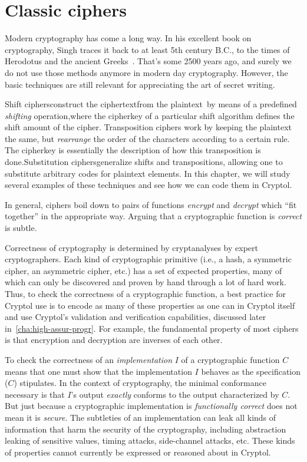 \chapter{Classic ciphers}
\label{chapter:classic}

Modern cryptography has come a long way. In his excellent book on
cryptography, Singh traces it back to at least 5th century B.C., to
the times of Herodotus and the ancient Greeks~\cite{Singh:1999:CBE}.
That's some 2500 years ago, and surely we do not use those methods
anymore in modern day cryptography. However, the basic techniques are
still relevant for appreciating the art of secret writing.

Shift ciphers\indShiftcipher construct the \glosCiphertext
ciphertext\indCiphertext from the \glosPlaintext
plaintext\indPlaintext\ by means of a predefined {\em shifting}
operation,\glosCipherkey where the cipherkey of a particular shift
algorithm defines the shift amount of the cipher.\indCipherkey
Transposition ciphers work by keeping the plaintext the same, but {\em
  rearrange} the order of the characters according to a certain rule.
The cipherkey is essentially the description of how this transposition
is done.\indTranspositioncipher Substitution
ciphers\indSubstitutioncipher generalize shifts and transpositions,
allowing one to substitute arbitrary codes for plaintext elements.  In
this chapter, we will study several examples of these techniques and
see how we can code them in Cryptol.

In general, ciphers boil down to pairs of functions \emph{encrypt} and
\emph{decrypt} which ``fit together'' in the appropriate way.  Arguing
that a cryptographic function is \emph{correct} is subtle.

Correctness of cryptography is determined by cryptanalyses by expert
cryptographers.  Each kind of cryptographic primitive (i.e., a hash, a
symmetric cipher, an asymmetric cipher, etc.) has a set of expected
properties, many of which can only be discovered and proven by hand
through a lot of hard work.  Thus, to check the correctness of a
cryptographic function, a best practice for Cryptol use is to encode
as many of these properties as one can in Cryptol itself and use
Cryptol's validation and verification capabilities, discussed
later in~\autoref{cha:high-assur-progr}.  For example, the fundamental
property of most ciphers is that encryption and decryption are
inverses of each other.

To check the correctness of an \emph{implementation} $I$ of a
cryptographic function $C$ means that one must show that the
implementation $I$ behaves as the specification ($C$) stipulates.  In
the context of cryptography, the minimal conformance necessary is
that $I$'s output \emph{exactly} conforms to the output characterized
by $C$.  But just because a cryptographic implementation is
\emph{functionally correct} does not mean it is \emph{secure}.  The
subtleties of an implementation can leak all kinds of information that
harm the security of the cryptography, including abstraction leaking
of sensitive values, timing attacks, side-channel attacks, etc.  These
kinds of properties cannot currently be expressed or reasoned about in
Cryptol.

